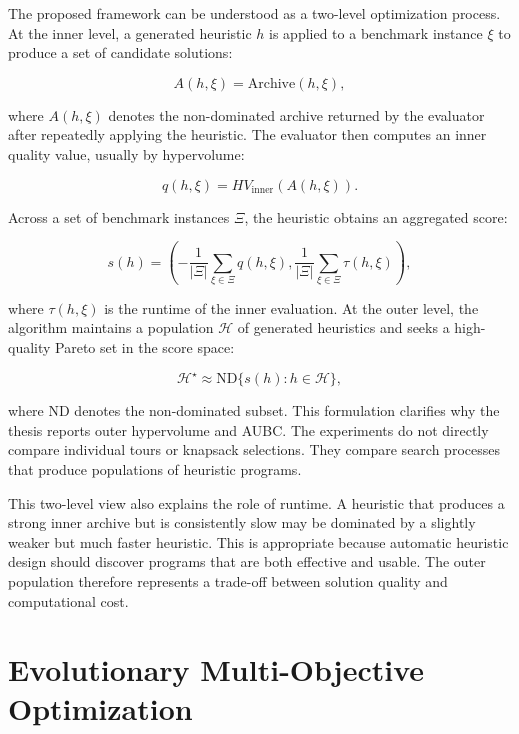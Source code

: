 \documentclass[../main.tex]{subfiles}
\begin{document}
The proposed framework can be understood as a two-level optimization process. At the inner level, a generated heuristic $h$ is applied to a benchmark instance $\xi$ to produce a set of candidate solutions:

\begin{equation}
  A(h,\xi) = \mathrm{Archive}\left(h, \xi\right),
\end{equation}

where $A(h,\xi)$ denotes the non-dominated archive returned by the evaluator after repeatedly applying the heuristic. The evaluator then computes an inner quality value, usually by hypervolume:

\begin{equation}
  q(h,\xi) = HV_{\mathrm{inner}}\left(A(h,\xi)\right).
\end{equation}

Across a set of benchmark instances $\Xi$, the heuristic obtains an aggregated score:

\begin{equation}
  s(h)
  =
  \left(
    -\frac{1}{|\Xi|}\sum_{\xi \in \Xi} q(h,\xi),
    \frac{1}{|\Xi|}\sum_{\xi \in \Xi} \tau(h,\xi)
  \right),
\end{equation}

where $\tau(h,\xi)$ is the runtime of the inner evaluation. At the outer level, the algorithm maintains a population $\mathcal{H}$ of generated heuristics and seeks a high-quality Pareto set in the score space:

\begin{equation}
  \mathcal{H}^{\star}
  \approx
  \mathrm{ND}\{s(h): h \in \mathcal{H}\},
\end{equation}

where $\mathrm{ND}$ denotes the non-dominated subset. This formulation clarifies why the thesis reports outer hypervolume and AUBC. The experiments do not directly compare individual tours or knapsack selections. They compare search processes that produce populations of heuristic programs.

This two-level view also explains the role of runtime. A heuristic that produces a strong inner archive but is consistently slow may be dominated by a slightly weaker but much faster heuristic. This is appropriate because automatic heuristic design should discover programs that are both effective and usable. The outer population therefore represents a trade-off between solution quality and computational cost.

\section{Evolutionary Multi-Objective Optimization}
\end{document}
